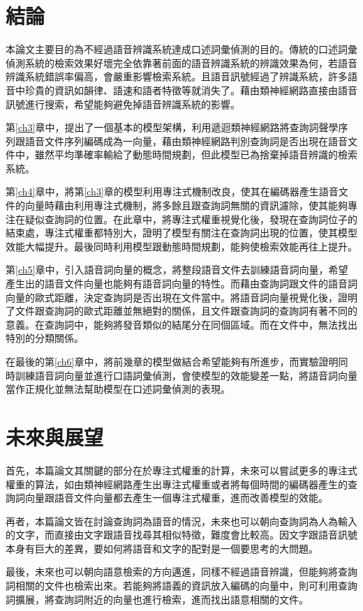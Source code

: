 \section{結論}
本論文主要目的為不經過語音辨識系統達成口述詞彙偵測的目的。傳統的口述詞彙偵測系統的檢索效果好壞完全依靠著前面的語音辨識系統的辨識效果為何，若語音辨識系統錯誤率偏高，會嚴重影響檢索系統。且語音訊號經過了辨識系統，許多語音中珍貴的資訊如韻律、語速和語者特徵等就消失了。藉由類神經網路直接由語音訊號進行搜索，希望能夠避免掉語音辨識系統的影響。

第\ref{ch3}章中，提出了一個基本的模型架構，利用遞迴類神經網路將查詢詞聲學序列跟語音文件序列編碼成為一向量，藉由類神經網路判別查詢詞是否出現在語音文件中，雖然平均準確率輸給了動態時間規劃，但此模型已為捨棄掉語音辨識的檢索系統。

第\ref{ch4}章中，將第\ref{ch3}章的模型利用專注式機制改良，使其在編碼器產生語音文件的向量時藉由利用專注式機制，將多餘且跟查詢詞無關的資訊濾除，使其能夠專注在疑似查詢詞的位置。在此章中，將專注式權重視覺化後，發現在查詢詞位子的結束處，專注式權重都特別大，證明了模型有關注在查詢詞出現的位置，使其模型效能大幅提升。最後同時利用模型跟動態時間規劃，能夠使檢索效能再往上提升。

第\ref{ch5}章中，引入語音詞向量的概念，將整段語音文件去訓練語音詞向量，希望產生出的語音文件向量也能夠有語音詞向量的特性。而藉由查詢詞跟文件的語音詞向量的歐式距離，決定查詢詞是否出現在文件當中。將語音詞向量視覺化後，證明了文件跟查詢詞的歐式距離並無絕對的關係，且文件跟查詢詞的查詢詞有著不同的意義。在查詢詞中，能夠將發音類似的結尾分在同個區域。而在文件中，無法找出特別的分類關係。

在最後的第\ref{ch6}章中，將前幾章的模型做結合希望能夠有所進步，而實驗證明同時訓練語音詞向量並進行口語詞彙偵測，會使模型的效能變差一點，將語音詞向量當作正規化並無法幫助模型在口述詞彙偵測的表現。
\section{未來與展望}
首先，本篇論文其關鍵的部分在於專注式權重的計算，未來可以嘗試更多的專注式權重的算法，如由類神經網路產生出專注式權重或者將每個時間的編碼器產生的查詢詞向量跟語音文件向量都去產生一個專注式權重，進而改善模型的效能。

再者，本篇論文皆在討論查詢詞為語音的情況，未來也可以朝向查詢詞為人為輸入的文字，而直接由文字跟語音找尋其相似特徵，難度會比較高。因文字跟語音訊號本身有巨大的差異，要如何將語音和文字的配對是一個要思考的大問題。

最後，未來也可以朝向語意檢索的方向邁進，同樣不經過語音辨識，但能夠將查詢詞相關的文件也檢索出來。若能夠將語義的資訊放入編碼的向量中，則可利用查詢詞擴展，將查詢詞附近的向量也進行檢索，進而找出語意相關的文件。
